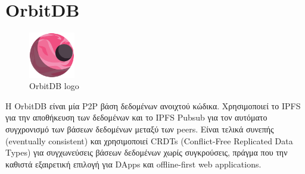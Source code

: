 \section{OrbitDB} \label{section:2-8-orbit-db}

\begin{figure}[H]
	\centering
	\includegraphics[width=2cm]{assets/figures/orbitdb-logo.png}
	\caption{OrbitDB logo}
\end{figure}

Η OrbitDB είναι μία P2P βάση δεδομένων ανοιχτού κώδικα. Χρησιμοποιεί το IPFS για την αποθήκευση των δεδομένων και το IPFS Pubsub για τον αυτόματο συγχρονισμό των βάσεων δεδομένων μεταξύ των peers. Είναι τελικά συνεπής (eventually consistent) και χρησιμοποιεί CRDTs (Conflict-Free Replicated Data Types) για συγχωνεύσεις βάσεων δεδομένων χωρίς συγκρούσεις, πράγμα που την καθιστά εξαιρετική επιλογή για DApps και offline-first web applications.\cite{2.8-orbitdb}


